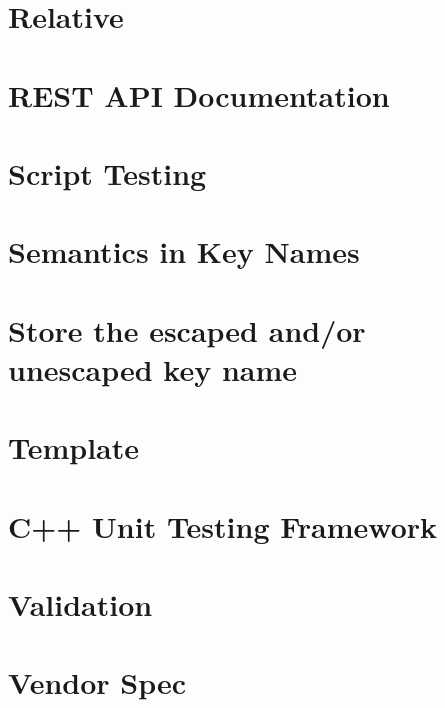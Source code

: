 \documentclass[twoside]{book}
\newcommand{\+}{\discretionary{\mbox{\scriptsize$\hookleftarrow$}}{}{}}
\begin{document}
\chapter{Relative}
\label{doc_decisions_relative_md}

\chapter{R\+E\+ST A\+PI Documentation}
\label{doc_decisions_rest_api_documentation_md}

\chapter{Script Testing}
\label{doc_decisions_script_testing_md}

\chapter{Semantics in Key Names}
\label{doc_decisions_semantics_name_md}

\chapter{Store the escaped and/or unescaped key name}
\label{doc_decisions_store_name_md}

\chapter{Template}
\label{doc_decisions_template_md}

\chapter{C++ Unit Testing Framework}
\label{doc_decisions_unit_testing_md}

\chapter{Validation}
\label{doc_decisions_validation_md}

\chapter{Vendor Spec}
\label{doc_decisions_vendor_spec_md}

\end{document}
